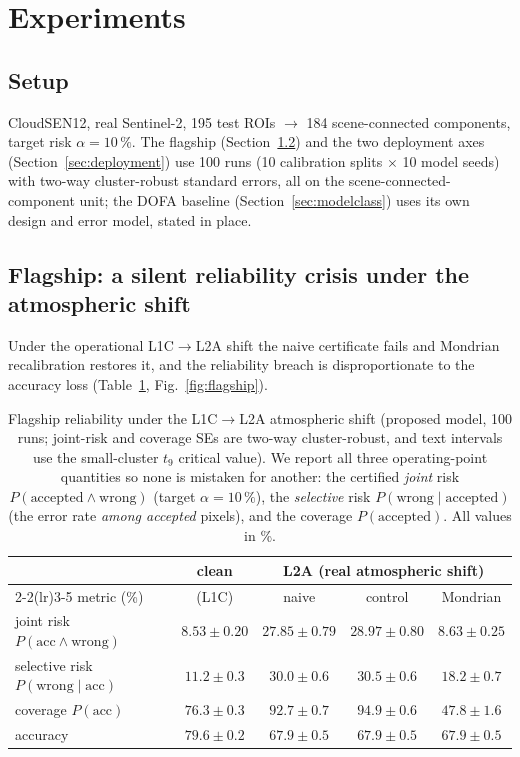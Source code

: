 \documentclass[preprint,3p,times]{elsarticle}
\begin{document}
\section{Experiments}
\subsection{Setup}
CloudSEN12, real Sentinel-2, 195 test ROIs $\to$ 184 scene-connected components, target risk $\alpha = 10\,\%$. The flagship (Section~\ref{sec:flagship}) and the two deployment axes (Section~\ref{sec:deployment}) use 100 runs (10 calibration splits $\times$ 10 model seeds) with two-way cluster-robust standard errors, all on the scene-connected-component unit; the DOFA baseline (Section~\ref{sec:modelclass}) uses its own design and error model, stated in place.

\subsection{Flagship: a silent reliability crisis under the atmospheric shift}
\label{sec:flagship}
Under the operational L1C$\to$L2A shift the naive certificate fails and Mondrian recalibration restores it, and the reliability breach is disproportionate to the accuracy loss (Table~\ref{tab:flagship}, Fig.~\ref{fig:flagship}).

\begin{table}[t]
\centering
\caption{Flagship reliability under the L1C$\to$L2A atmospheric shift (proposed model, 100 runs; joint-risk and coverage SEs are two-way cluster-robust, and text intervals use the small-cluster $t_9$ critical value). We report all three operating-point quantities so none is mistaken for another: the certified \emph{joint} risk $P(\text{accepted}\wedge\text{wrong})$ (target $\alpha = 10\,\%$), the \emph{selective} risk $P(\text{wrong}\mid\text{accepted})$ (the error rate \emph{among accepted} pixels), and the coverage $P(\text{accepted})$. All values in \%.}
\label{tab:flagship}
\begin{tabular}{lcccc}
\toprule
 & clean & \multicolumn{3}{c}{L2A (real atmospheric shift)} \\
\cmidrule(lr){2-2}\cmidrule(lr){3-5}
metric (\%) & (L1C) & naive & control & Mondrian \\
\midrule
joint risk $P(\mathrm{acc}\wedge\mathrm{wrong})$   & $8.53\pm0.20$ & $\mathbf{27.85 \pm 0.79}$ & $28.97 \pm 0.80$ & $\mathbf{8.63 \pm 0.25}$ \\
selective risk $P(\mathrm{wrong}\mid\mathrm{acc})$ & $11.2\pm0.3$ & $30.0\pm0.6$ & $30.5\pm0.6$ & $18.2\pm0.7$ \\
coverage $P(\mathrm{acc})$                          & $76.3\pm0.3$ & $92.7 \pm 0.7$ & $94.9 \pm 0.6$ & $47.8 \pm 1.6$ \\
accuracy                                            & $79.6\pm0.2$ & $67.9\pm0.5$ & $67.9\pm0.5$ & $67.9\pm0.5$ \\
\bottomrule
\end{tabular}
\end{table}
\end{document}
